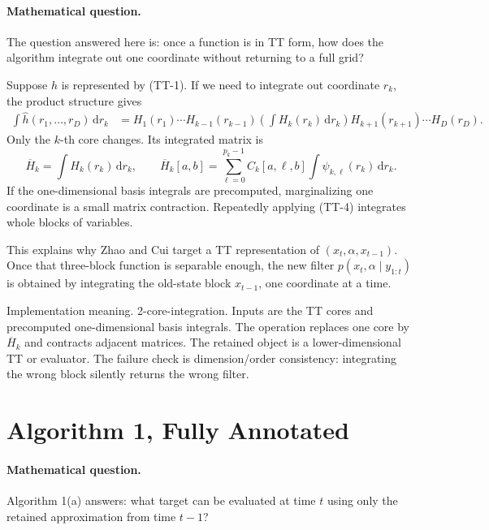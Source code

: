 \documentclass[11pt]{article}
\numberwithin{equation}{section}
\newcommand{\dd}{\,\mathrm d}
\begin{document}
\paragraph{Mathematical question.}
The question answered here is: once a function is in TT form, how does the
algorithm integrate out one coordinate without returning to a full grid?

Suppose \(h\) is represented by (TT-1).  If we need to integrate out coordinate
\(r_k\), the product structure gives
\begin{equation}
\begin{aligned}
 \int \widehat h(r_1,\ldots,r_D)\dd r_k
 &=
 H_1(r_1)\cdots H_{k-1}(r_{k-1})
 \left(\int H_k(r_k)\dd r_k\right)
 H_{k+1}(r_{k+1})\cdots H_D(r_D).
\end{aligned}
\label{eq:p24-tt-4}
\end{equation}
Only the \(k\)-th core changes.  Its integrated matrix is
\begin{equation}
    \overline H_k
    =
    \int H_k(r_k)\dd r_k,\qquad
    \overline H_k[a,b]
    =
    \sum_{\ell=0}^{p_k-1} C_k[a,\ell,b]
    \int \psi_{k,\ell}(r_k)\dd r_k.
    \label{eq:p24-tt-5}
\end{equation}
If the one-dimensional basis integrals are precomputed, marginalizing one
coordinate is a small matrix contraction.  Repeatedly applying (TT-4) integrates
whole blocks of variables.

This explains why Zhao and Cui \cite{zhao2024ttsequential} target a TT representation of
\((x_t,\alpha,x_{t-1})\).  Once that three-block function is separable enough,
the new filter \(p(x_t,\alpha\mid y_{1:t})\) is obtained by integrating the
old-state block \(x_{t-1}\), one coordinate at a time.

Implementation meaning. 2-core-integration.  Inputs are the TT cores and
precomputed one-dimensional basis integrals.  The operation replaces one core
by \(\overline H_k\) and contracts adjacent matrices.  The retained object is a
lower-dimensional TT or evaluator.  The failure check is dimension/order
consistency: integrating the wrong block silently returns the wrong filter.

\section{Algorithm 1, Fully Annotated}

\paragraph{Mathematical question.}
Algorithm 1(a) answers: what target can be evaluated at time \(t\) using only
the retained approximation from time \(t-1\)?
\end{document}
